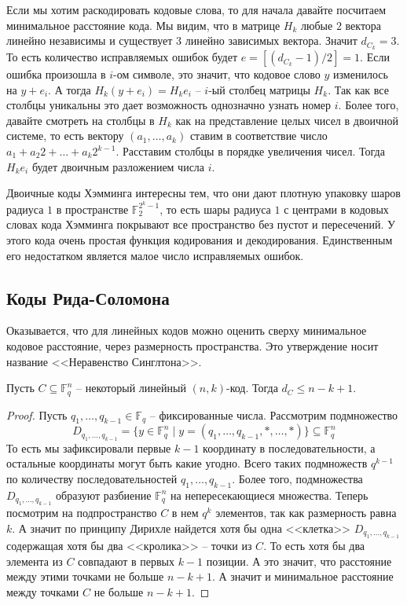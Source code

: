 Если мы хотим раскодировать кодовые слова, то для начала давайте посчитаем минимальное расстояние кода.
Мы видим, что в матрице $H_k$ любые $2$ вектора линейно независимы и существует $3$ линейно зависимых вектора.
Значит $d_{C_k} = 3$.
То есть количество исправляемых ошибок будет $e = [(d_{C_k} - 1)/2] = 1$.
Если ошибка произошла в $i$-ом символе, это значит, что кодовое слово $y$ изменилось на $y + e_i$.
А тогда $H_k(y + e_i) = H_ke_i$ -- $i$-ый столбец матрицы $H_k$.
Так как все столбцы уникальны это дает возможность однозначно узнать номер $i$.
Более того, давайте смотреть на столбцы в $H_k$ как на представление целых чисел в двоичной системе, то есть вектору $(a_1,\ldots,a_k)$ ставим в соответствие число $a_1 + a_2 2 +\ldots + a_k 2^{k-1}$.
Расставим столбцы в порядке увеличения чисел.
Тогда $H_k e_i$ будет двоичным разложением числа $i$.

Двоичные коды Хэмминга интересны тем, что они дают плотную упаковку шаров радиуса $1$ в пространстве $\mathbb F_2^{2^k - 1}$, то есть шары радиуса $1$ с центрами в кодовых словах кода Хэмминга покрывают все пространство без пустот и пересечений.
У этого кода очень простая функция кодирования и декодирования.
Единственным его недостатком является малое число исправляемых ошибок.

\subsection{Коды Рида-Соломона}

Оказывается, что для линейных кодов можно оценить сверху минимальное кодовое расстояние, через размерность пространства.
Это утверждение носит название <<Неравенство Синглтона>>.

\begin{claim}
Пусть $C\subseteq \mathbb F_q^n$ -- некоторый линейный $(n,k)$-код.
Тогда $d_C \leqslant n - k + 1$.
\end{claim}
\begin{proof}
Пусть $q_1,\ldots,q_{k-1}\in \mathbb F_q$ -- фиксированные числа.
Рассмотрим подмножество
\[
D_{q_1,\ldots, q_{k-1}} = \{y\in \mathbb F_q^n \mid y = (q_1,\ldots, q_{k-1}, *,\ldots, *)\}\subseteq \mathbb F_q^n
\]
То есть мы зафиксировали первые $k-1$ координату в последовательности, а остальные координаты могут быть какие угодно.
Всего таких подмножеств $q^{k-1}$ по количеству последовательностей $q_1,\ldots,q_{k-1}$.
Более того, подмножества $D_{q_1,\ldots, q_{k-1}}$ образуют разбиение $\mathbb F_q^n$ на непересекающиеся множества.
Теперь посмотрим на подпространство $C$ в нем $q^k$ элементов, так как размерность равна $k$.
А значит по принципу Дирихле найдется хотя бы одна <<клетка>> $D_{q_1,\ldots,q_{k-1}}$ содержащая хотя бы два <<кролика>> -- точки из $C$.
То есть хотя бы два элемента из $C$ совпадают в первых $k-1$ позиции.
А это значит, что расстояние между этими точками не больше $n-k+1$.
А значит и минимальное расстояние между точками $C$ не больше $n - k + 1$.
\end{proof}


